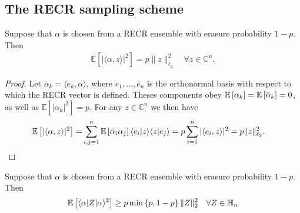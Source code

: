 \subsection{The RECR sampling scheme}

\begin{lemma}
Suppose that $\alpha$ is chosen from a RECR ensemble with erasure probability $1-p$. Then
\begin{align}
  \mathbb{E} \left[ | \langle  \alpha, z \rangle|^2 \right] = p \|  z \|_{\ell_2}^2
  \quad \forall  z \in \mathbb{C}^n.
\end{align}
\end{lemma}

\begin{proof}
Let $\alpha_k = \langle  e_k, \alpha\rangle$, where $ e_1,\ldots, e_n$ is the orthonormal basis with respect to which the RECR vector is defined.
Theses components obey $\mathbb{E}\left[ \alpha_k \right] = \mathbb{E} \left[ \bar{\alpha}_k \right] = 0$, as well as $\mathbb{E} \left[ |\alpha_k|^2 \right] = p$.
For any $ z \in \mathbb{C}^n$ we then have
\begin{align}
  \mathbb{E} \left[| \langle  \alpha,  z\rangle |^2 \right]
  =& \sum_{i,j=1}^n \mathbb{E} \left[ \bar{\alpha}_i \alpha_j \right] \langle  e_i |  z \rangle \langle  z |  e_j \rangle = p \sum_{i=1}^n | \langle  e_i,  z \rangle|^2 = p \|  z \|_{\ell_2}^2.
\end{align}
\end{proof}

\begin{lemma}
  \label{lem:recr_subisotropic}
  Suppose that $\alpha$ is chosen from a RECR ensemble with erasure probability $1-p$. Then
  \[
  \mathbb{E} \left[ \langle  \alpha|  Z | \alpha \rangle^2 \right] \geq p \min \left\{ p, 1-p \right\} \|  Z \|_2^2 \quad \forall  Z \in \mathbb{H}_n
  \]
\end{lemma}

